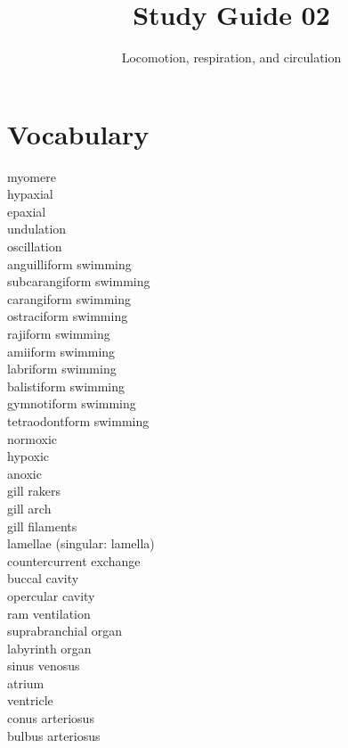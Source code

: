 \documentclass[nofonts, letterpaper]{tufte-handout}
\title{Study Guide 02}
\author{Locomotion, respiration, and circulation}
\date{} %
\begin{document}
\maketitle	%


\section{Vocabulary} 
\vspace{-1\baselineskip}
\begin{multicols}{2}
myomere\\
hypaxial\\
epaxial\\
undulation \\
oscillation \\
anguilliform swimming \\
subcarangiform swimming \\
carangiform swimming \\
ostraciform swimming \\
rajiform swimming \\
amiiform swimming  \\
labriform swimming \\
balistiform swimming \\
gymnotiform swimming \\
tetraodontform swimming \\
normoxic \\
hypoxic \\
anoxic \\
gill rakers \\
gill arch \\
gill filaments \\
lamellae (singular: lamella) \\
countercurrent exchange \\
buccal cavity \\
opercular cavity \\
ram ventilation \\
suprabranchial organ \\
labyrinth organ \\
sinus venosus \\
atrium \\
ventricle \\
conus arteriosus \\
bulbus arteriosus \\

\end{multicols}
\end{document}

